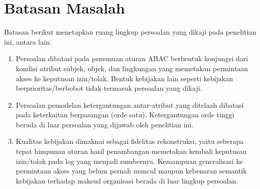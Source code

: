 \section{Batasan Masalah}

Batasan berikut menetapkan ruang lingkup persoalan yang dikaji pada penelitian ini, antara lain:

\begin{enumerate}
  \item Persoalan dibatasi pada penemuan aturan ABAC berbentuk konjungsi dari kondisi atribut subjek, objek, dan lingkungan yang memetakan permintaan akses ke keputusan izin/tolak. Bentuk kebijakan lain seperti kebijakan berprioritas/berbobot tidak termasuk persoalan yang dikaji.
  \item Persoalan pemodelan ketergantungan antar-atribut yang ditelaah dibatasi pada keterkaitan berpasangan (orde satu). Ketergantungan orde tinggi berada di luar persoalan yang dijawab oleh penelitian ini.
  \item Kualitas kebijakan dimaknai sebagai fidelitas rekonstruksi, yaitu seberapa tepat himpunan aturan hasil penambangan memetakan kembali keputusan izin/tolak pada log yang menjadi sumbernya. Kemampuan generalisasi ke permintaan akses yang belum pernah muncul maupun kebenaran semantik kebijakan terhadap maksud organisasi berada di luar lingkup persoalan.
\end{enumerate}